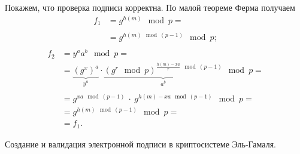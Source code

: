 Покажем, что проверка подписи корректна. По малой теореме Ферма получаем
\[ \begin{array}{ll}
    f_1 & = g^{h(m)} \mod p = \\
    & \\
    & = g^{h(m) \mod (p-1)} \mod p; \\
\end{array} \] \[ \begin{array}{ll}
    f_2 & = y^a a^b \mod p = \\
    & = \underbrace{\left( g^x \right)^a}_{y^a} \cdot
        \underbrace{\left( g^r \mod p \right)^{\frac{h(m) - xa}{r} \mod (p-1)}}_{a^b} \mod p = \\
    & \\
    & = g^{xa \mod (p-1)} ~\cdot~ g^{h(m) - xa \mod (p-1)} \mod p = \\
    & = g^{h(m) \mod (p-1)} \mod p = \\
    & = f_1.
\end{array} \]

\example Создание и валидация электронной подписи в криптосистеме Эль-Гамаля.

